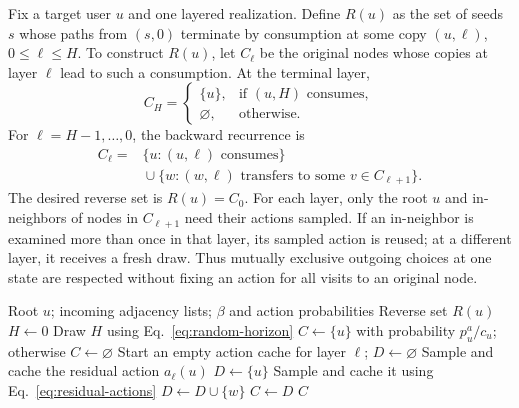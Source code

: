 Fix a target user $u$ and one layered realization. Define $R(u)$ as
the set of seeds $s$ whose paths from $(s,0)$ terminate by consumption
at some copy $(u,\ell)$, $0\leq\ell\leq H$. To construct $R(u)$,
let $C_\ell$ be the original nodes whose copies at layer $\ell$ lead
to such a consumption. At the terminal layer,
\[
  C_H=\begin{cases}\{u\},&\text{if $(u,H)$ consumes},\\
                     \varnothing,&\text{otherwise.}\end{cases}
\]
For $\ell=H-1,\ldots,0$, the backward recurrence is
\begin{equation}
\label{eq:backward-layers}
\begin{split}
  C_\ell={}&\{u:\text{$(u,\ell)$ consumes}\}\\
  &{}\cup\{w:\text{$(w,\ell)$ transfers to some }v\in C_{\ell+1}\}.
\end{split}
\end{equation}
The desired reverse set is $R(u)=C_0$.
For each layer, only the root $u$ and in-neighbors of nodes in
$C_{\ell+1}$ need their actions sampled. If an in-neighbor is examined
more than once in that layer, its sampled action is reused; at a
different layer, it receives a fresh draw. Thus mutually exclusive
outgoing choices at one state are respected without fixing an action
for all visits to an original node.

\begin{algorithm}[t]
\caption{Layered Reverse Sample $\textsc{ReverseCoupon}(u)$}
\label{alg:rrset}
\begin{algorithmic}[1]
\Require Root $u$; incoming adjacency lists; $\beta$ and action probabilities
\Ensure Reverse set $R(u)$
  \State $H\gets0$
\Else
  \State Draw $H$ using Eq.~\eqref{eq:random-horizon}
\EndIf
\State $C\gets\{u\}$ with probability $p_u^a/c_u$; otherwise $C\gets\varnothing$
  \State Start an empty action cache for layer $\ell$; $D\gets\varnothing$
  \State Sample and cache the residual action $a_\ell(u)$
    \State $D\gets\{u\}$
  \EndIf
        \State Sample and cache it using Eq.~\eqref{eq:residual-actions}
      \EndIf
        \State $D\gets D\cup\{w\}$
      \EndIf
    \EndFor
  \EndFor
  \State $C\gets D$
\EndFor
\State \Return $C$
\end{algorithmic}
\end{algorithm}

